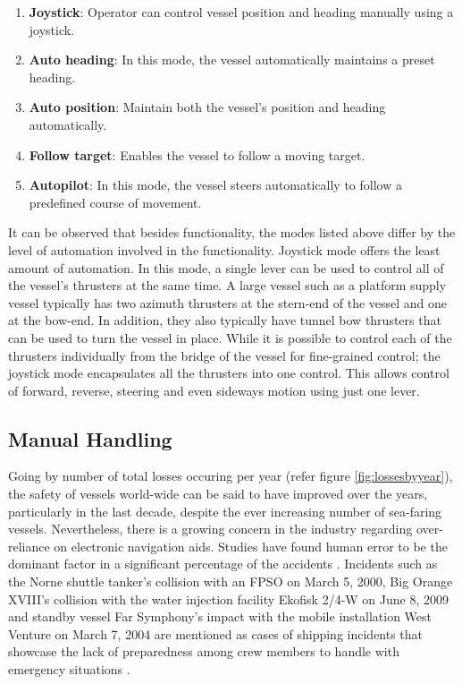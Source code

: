 \begin{enumerate}

\item \textbf{Joystick}: Operator can control vessel position and heading manually using a joystick. 
\item \textbf{Auto heading}: In this mode, the vessel automatically maintains a preset heading. 
\item \textbf{Auto position}: Maintain both the vessel's position and heading automatically. 
\item \textbf{Follow target}: Enables the vessel to follow a moving target. 
\item \textbf{Autopilot}: In this mode, the vessel steers automatically to follow a predefined course of movement. 

\end{enumerate}

It can be observed that besides functionality, the modes listed above differ by the level of automation involved in the functionality. Joystick mode offers the least amount of automation. In this mode, a single lever can be used to control all of the vessel's thrusters at the same time. A large vessel such as a platform supply vessel typically has two azimuth thrusters at the stern-end of the vessel and one at the bow-end. In addition, they also typically have tunnel bow thrusters that can be used to turn the vessel in place. While it is possible to control each of the thrusters individually from the bridge of the vessel for fine-grained control; the joystick mode encapsulates all the thrusters into one control. This allows control of forward, reverse, steering and even sideways motion using just one lever. 


\subsection{Manual Handling}
Going by number of total losses occuring per year (refer figure \ref{fig:lossesbyyear}), the safety of vessels world-wide can be said to have improved over the years, particularly in the last decade, despite the ever increasing number of sea-faring vessels. Nevertheless, there is a growing concern in the industry regarding over-reliance on electronic navigation aids. Studies have found human error to be the dominant factor in a significant percentage of the accidents \parencite{baker2005accident, hauff2014analysis}. Incidents such as the Norne shuttle tanker's collision with an FPSO on March 5, 2000, Big Orange XVIII's collision with the water injection facility Ekofisk 2/4-W on June 8, 2009 and standby vessel Far Symphony's impact with the mobile installation West Venture on March 7, 2004 are mentioned as cases of shipping incidents that showcase the lack of preparedness among crew members to handle with emergency situations \parencite{vinnem2013offshore}.

